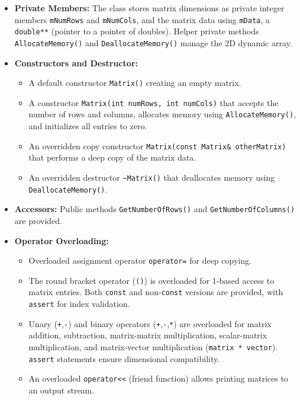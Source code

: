 \begin{itemize}
    \item \textbf{Private Members:} The class stores matrix dimensions as private integer members \texttt{mNumRows} and \texttt{mNumCols}, and the matrix data using \texttt{mData}, a \texttt{double**} (pointer to a pointer of doubles). Helper private methods \texttt{AllocateMemory()} and \texttt{DeallocateMemory()} manage the 2D dynamic array.
    \item \textbf{Constructors and Destructor:}
        \begin{sloppypar}
        \begin{itemize}
            \item A default constructor \texttt{Matrix()} creating an empty matrix.
            \item A constructor \texttt{Matrix(int numRows, int numCols)} that accepts the number of rows and columns, allocates memory using \texttt{AllocateMemory()}, and initializes all entries to zero.
            \item An overridden copy constructor \texttt{Matrix(const Matrix\& otherMatrix)} that performs a deep copy of the matrix data.
            \item An overridden destructor \texttt{\textasciitilde Matrix()} that deallocates memory using \texttt{DeallocateMemory()}.
        \end{itemize}
        \end{sloppypar}
    \item \textbf{Accessors:} Public methods \texttt{GetNumberOfRows()} and \texttt{GetNumberOfColumns()} are provided.
    \item \textbf{Operator Overloading:}
        \begin{itemize}
            \item Overloaded assignment operator \texttt{operator=} for deep copying.
            \item The round bracket operator (\texttt{()}) is overloaded for 1-based access to matrix entries. Both \texttt{const} and non-\texttt{const} versions are provided, with \texttt{assert} for index validation.
            \item Unary (\texttt{+},\texttt{-}) and binary operators (\texttt{+},\texttt{-},\texttt{*}) are overloaded for matrix addition, subtraction, matrix-matrix multiplication, scalar-matrix multiplication, and matrix-vector multiplication (\texttt{matrix * vector}). \texttt{assert} statements ensure dimensional compatibility.
            \item An overloaded \texttt{operator<<} (friend function) allows printing matrices to an output stream.

\end{itemize}
\end{itemize}

